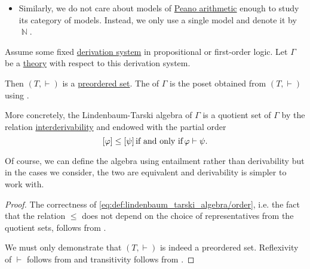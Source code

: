 \begin{example}
\begin{itemize}
    \item Similarly, we do not care about models of \hyperref[def:peano_arithmetic]{Peano arithmetic} enough to study its category of models. Instead, we only use a single model and denote it by \( \BbbN \).
  \end{itemize}
\end{example}

\begin{definition}\label{def:lindenbaum_tarski_algebra}
  Assume some fixed \hyperref[def:logical_derivation_system]{derivation system} in propositional or first-order logic. Let \( \Gamma \) be a \hyperref[def:first_order_theory]{theory} with respect to this derivation system.

  Then \( (T, \vdash) \) is a \hyperref[def:preordered_set]{preordered set}. The  of \( \Gamma \) is the poset obtained from \( (T, \vdash) \) using .

  More concretely, the Lindenbaum-Tarski algebra of \( \Gamma \) is a quotient set of \( \Gamma \) by the relation \hyperref[def:derivation_system_derivability]{interderivability} and endowed with the partial order
  \begin{equation}\label{eq:def:lindenbaum_tarski_algebra/order}
    [\varphi] \leq [\psi] \T{if and only if} \varphi \vdash \psi.
  \end{equation}

  Of course, we can define the algebra using entailment rather than derivability but in the cases we consider, the two are equivalent and derivability is simpler to work with.
\end{definition}
\begin{proof}
  The correctness of \eqref{eq:def:lindenbaum_tarski_algebra/order}, i.e. the fact that the relation \( \leq \) does not depend on the choice of representatives from the quotient sets, follows from .

  We must only demonstrate that \( (T, \vdash) \) is indeed a preordered set. Reflexivity of \( \vdash \) follows from  and transitivity follows from .
\end{proof}

